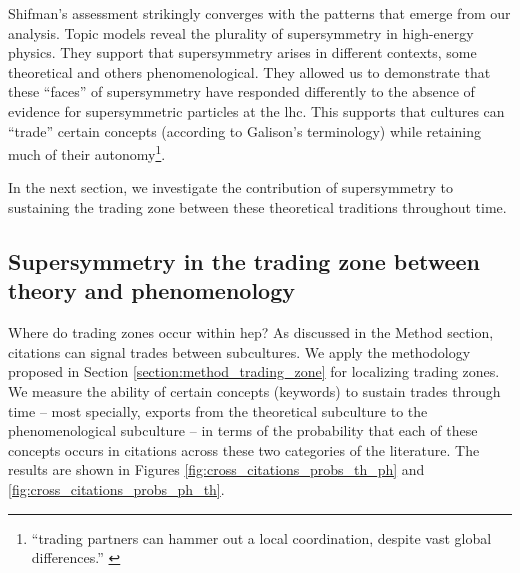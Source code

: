 \documentclass[smallextended]{svjour3}
\begin{document}


Shifman's assessment strikingly converges with the patterns that emerge from our analysis. Topic models reveal the plurality of supersymmetry in high-energy physics. They support that supersymmetry arises in different contexts, some theoretical and others phenomenological. They allowed us to demonstrate that these ``faces'' of supersymmetry have responded differently to the absence of evidence for supersymmetric particles at the \gls{lhc}. This supports that cultures can ``trade'' certain concepts (according to Galison's terminology) while retaining much of their autonomy\footnote{``trading partners can hammer out a local coordination, despite vast global differences.'' \citep[p.~783]{galison1997image}}.

In the next section, we investigate the contribution of supersymmetry to sustaining the trading zone between these theoretical traditions throughout time.

\subsection{Supersymmetry in the trading zone between theory and phenomenology}

Where do trading zones occur within \gls{hep}? As discussed in the Method section, citations can signal trades between subcultures. We apply the methodology proposed in Section \ref{section:method_trading_zone} for localizing trading zones. We measure the ability of certain concepts (keywords) to sustain trades through time -- most specially, exports from the theoretical subculture to the phenomenological subculture -- in terms of the probability that each of these concepts occurs in citations across these two categories of the literature. The results are shown in Figures \ref{fig:cross_citations_probs_th_ph} and \ref{fig:cross_citations_probs_ph_th}.
\end{document}
